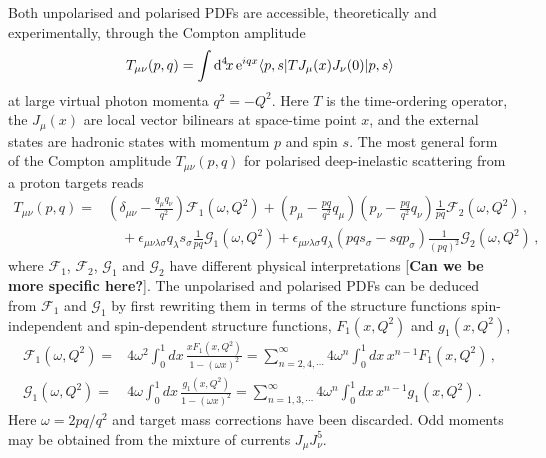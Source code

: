Both unpolarised and polarised PDFs are accessible, theoretically and experimentally, through the Compton amplitude
\begin{equation}
T_{\mu\nu}(p,q) = \int {\rm d}^4\!x\, {\rm e}^{iqx}  \langle p,s |T J_\mu(x) J_\nu(0)|p,s\rangle   
\end{equation}
at large virtual photon momenta $q^2=-Q^2$. Here $T$ is the time-ordering operator, the $J_\mu(x)$ are local vector bilinears at space-time point $x$, and the external states are hadronic states with momentum $p$ and spin $s$. The most general form of the Compton amplitude $T_{\mu\nu}(p,q)$ for polarised deep-inelastic scattering from a proton targets reads
\begin{align}
T_{\mu\nu}(p,q) = {} & \left(\delta_{\mu\nu}-\frac{q_\mu q_\nu}{q^2}\right) \mathcal{F}_1(\omega,Q^2) + \left(p_\mu-\frac{pq}{q^2}q_\mu\right) \left(p_\nu-\frac{pq}{q^2}q_\nu\right) \frac{1}{pq} \mathcal{F}_2(\omega,Q^2)\,,\\ 
& {} \quad  + \epsilon_{\mu\nu\lambda\sigma}q_\lambda s_\sigma \frac{1}{pq}\mathcal{G}_1(\omega,Q^2) + \epsilon_{\mu\nu\lambda\sigma}q_\lambda \left(pq s_\sigma - sq p_\sigma\right) \frac{1}{(pq)^2}\mathcal{G}_2(\omega,Q^2)\,,
\end{align}
where $\mathcal{F}_1$, $\mathcal{F}_2$, $\mathcal{G}_1$ and $\mathcal{G}_2$ have different physical interpretations [\textbf{Can we be more specific here?}]. The unpolarised and polarised PDFs can be deduced from $\mathcal{F}_1$ and $\mathcal{G}_1$ by first rewriting them in terms of the structure functions spin-independent and spin-dependent structure functions, $F_1(x,Q^2)$ and $g_1(x,Q^2)$,
\begin{align}
\mathcal{F}_1(\omega,Q^2) = {} & 4 \omega^2 \int_0^1 dx\,  \frac{xF_1(x,Q^2)}{1-(\omega x)^2} = \sum_{n=2,4,\cdots}^\infty 4\omega^n \int_0^1 dx\, x^{n-1} F_1(x,Q^2) \,, \\
\mathcal{G}_1(\omega,Q^2) = {} & 4 \omega \int_0^1 dx\, \frac{g_1(x,Q^2)}{1-(\omega x)^2} = \sum_{n=1,3,\cdots}^\infty 4\omega^n \int_0^1 dx\, x^{n-1} g_1(x,Q^2)\,.
\end{align}
Here $\omega=2pq/q^2$ and target mass corrections have been discarded. Odd moments may be obtained from the mixture of currents $J_\mu J_\nu^5$.

